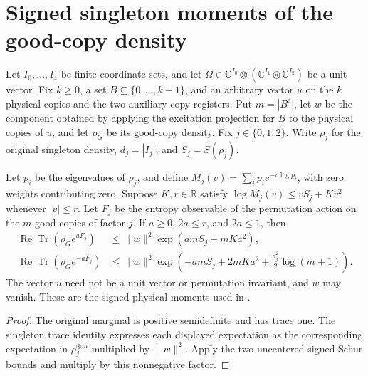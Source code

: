 \section{Signed singleton moments of the good-copy density}

\begin{theorem}
  \label{thm:replica_good_configuration_signed_singleton_moments}
  \leanok
  Let $I_0,\ldots,I_4$ be finite coordinate sets, and let
  $\Omega\in\mathbb C^{I_0}\otimes
  (\mathbb C^{I_1}\otimes\mathbb C^{I_2})$ be a unit vector.
  Fix $k\geq0$, a set $B\subseteq\{0,\ldots,k-1\}$, and an
  arbitrary vector $u$ on the $k$ physical copies and the two
  auxiliary copy registers. Put $m=|B^c|$, let $w$ be the component
  obtained by applying the excitation projection for $B$ to the
  physical copies of $u$, and let $\rho_G$ be its good-copy density.
  Fix $j\in\{0,1,2\}$. Write $\rho_j$ for the original singleton
  density, $d_j=|I_j|$, and $S_j=S(\rho_j)$.

  Let $p_i$ be the eigenvalues of $\rho_j$, and define
  $M_j(v)=\sum_i p_i e^{-v\log p_i}$, with zero weights
  contributing zero. Suppose $K,r\in\mathbb R$ satisfy
  $\log M_j(v)\leq vS_j+Kv^2$ whenever $|v|\leq r$.
  Let $F_j$ be the entropy observable of the permutation action
  on the $m$ good copies of factor $j$. If $a\geq0$, $2a\leq r$,
  and $2a\leq1$, then
  \begin{align*}
    \operatorname{Re}\operatorname{Tr}(\rho_G e^{aF_j})
      &\leq \|w\|^2\exp(amS_j+mKa^2),\\
    \operatorname{Re}\operatorname{Tr}(\rho_G e^{-aF_j})
      &\leq \|w\|^2
        \exp\!\left(-amS_j+2mKa^2+\frac{d_j^2}{2}\log(m+1)\right).
  \end{align*}
  The vector $u$ need not be a unit vector or permutation invariant,
  and $w$ may vanish. These are the signed physical moments used in
  \cite[Section~8]{OpenAI2026AreaLaw}.
\end{theorem}
\begin{proof}\leanok
  The original marginal is positive semidefinite and has trace one.
  The singleton trace identity expresses each displayed expectation
  as the corresponding expectation in $\rho_j^{\otimes m}$ multiplied
  by $\|w\|^2$. Apply the two uncentered signed Schur bounds and
  multiply by this nonnegative factor.
\end{proof}
